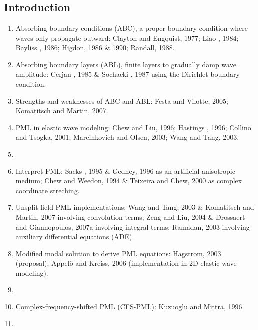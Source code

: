 \renewcommand{\pmk}{ZhangW\_2010\_Geophy\_ADE CFS-PML}
\renewcommand{\prf}{WaveForward/\pmk.pdf}
\renewcommand{\pti}{Unsplit complex frequency-shifted PML implementation using auxiliary differential equations for seismic wave modeling}
\renewcommand{\pay}{Wei Zhang, Yang Shen, 2010}
\renewcommand{\pjo}{Geophysics}
\renewcommand{\pda}{2016/11/6 Sun.}
\section{\pinfo}
\subsection{Introduction}
\begin{enumerate}[\hspace{10mm}*]
  \item Absorbing boundary conditions (ABC), a proper boundary condition where waves only propagate outward: Clayton and Engquist, 1977; Liao \etal, 1984; Bayliss \etal, 1986; Higdon, 1986 \& 1990; Randall, 1988.
  \item Absorbing boundary layers (ABL), finite layers to gradually damp wave amplitude: Cerjan \etal, 1985 \& Sochacki \etal, 1987 using the Dirichlet boundary condition.
  \item Strengths and weaknesses of ABC and ABL: Festa and Vilotte, 2005; Komatitsch and Martin, 2007.
  \item PML in elastic wave modeling: Chew and Liu, 1996; Hastings \etal, 1996; Collino and Tsogka, 2001; Marcinkovich and Olsen, 2003; Wang and Tang, 2003.
  \item \sline
  \item Interpret PML: Sacks \etal, 1995 \& Gedney, 1996 as an artificial anisotropic medium; Chew and Weedon, 1994 \& Teixeira and Chew, 2000 as complex coordinate streching.
  \item Unsplit-field PML implementations: Wang and Tang, 2003 \& Komatitsch and Martin, 2007 involving convolution terms; Zeng and Liu, 2004 \& Drossaert and Giannopoulos, 2007a involving integral terms; Ramadan, 2003 involving auxiliary differential equations (ADE).
  \item Modified modal solution to derive PML equations: Hagstrom, 2003 (proposal); Appel\"{o} and Kreiss, 2006 (implementation in 2D elastic wave modeling).
  \item \sline
  \item Complex-frequency-shifted PML (CFS-PML): Kuzuoglu and Mittra, 1996.
  \item \sline

\end{enumerate}
